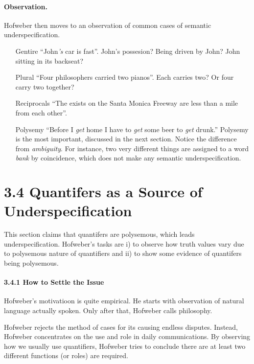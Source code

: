\documentclass[
10pt, %
a4paper, %
twocolumn, %
landscape %
]{article}
\begin{document}
 \paragraph{Observation.}
 Hofweber then moves to an observation of common cases of semantic underspecification.

 \begin{enumerate}
 	\item [Gentire] ``John\emph{'s} car is fast''. John's possesion? Being driven by John? John sitting in its backseat?
	\item[Plural] ``Four philosophers carried two pianos''. Each carries two? Or four carry two together?
	\item[Reciprocals]
	``The exists on the Santa Monica Freeway are less than a mile from each other''.
	\item[Polysemy]
	``Before I \emph{get} home I have to \emph{get} some beer to \emph{get} drunk.''
	Polysemy is the most important, discussed in the next section. Notice the difference from \emph{ambiguity}. For instance, two very different things are assigned to a word \emph{bank} by coincidence, which does not make any semantic underspecification.
 \end{enumerate}

 \section*{3.4 Quantifers as a Source of Underspecification}
 This section claims that quantifers are polysemous, which leads underspecification.
 Hofweber's tasks are i) to observe how truth values vary due to polysemous nature of quantifiers and ii) to show some evidence of quantifers being polysemous.

 \paragraph{3.4.1 How to Settle the Issue}
 Hofweber's motivatioon is quite empirical.
 He starts with observation of natural language actually spoken. Only after that, Hofweber calls philosophy.

 Hofweber rejects the method of cases for its causing endless disputes. Instead, Hofweber concentrates on the use and role in daily communications. By observing how we usually use quantifiers, Hofweber tries to conclude there are at least two different functions (or roles) are required.
\end{document}
